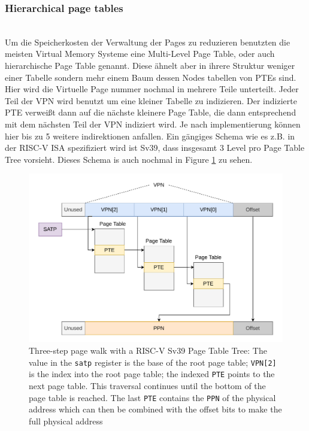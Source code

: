 \subsubsection{Hierarchical page tables}
\\
Um die Speicherkosten der Verwaltung der Pages zu reduzieren benutzten die meisten 
Virtual Memory Systeme eine Multi-Level Page Table, oder auch hierarchische Page Table genannt.
Diese ähnelt aber in ihrere Struktur weniger einer Tabelle sondern mehr einem Baum dessen Nodes tabellen
von PTEs sind.
Hier wird die Virtuelle Page nummer nochmal in mehrere Teile unterteilt. Jeder Teil der VPN
wird benutzt um eine kleiner Tabelle zu indizieren. Der indizierte PTE verweißt dann auf die
nächste kleinere Page Table, die dann entsprechend mit dem nächsten Teil der VPN indiziert wird.
Je nach implementierung können hier bis zu 5 weitere indirektionen anfallen.
Ein gängiges Schema wie es z.B. in der RISC-V ISA spezifiziert wird ist Sv39, dass insgesamt
3 Level pro Page Table Tree vorsieht\cite{riscvreader}. Dieses Schema is auch nochmal
in Figure \ref{fig:fund:pagetree} zu sehen.
\begin{figure}[t]
    \centering
    \includegraphics[scale=.8]{figures/VM-Tree.pdf}
    \caption[RISC-V Sv39 3-Level Page Tree]{Three-step page walk with a RISC-V Sv39 Page Table Tree:
        The value in the \texttt{satp} register is the base of the root page table; \texttt{VPN[2]}
        is the index into the root page table; the indexed \texttt{PTE} points to the next page table.
        This traversal continues until the bottom of the page table is reached. The last \texttt{PTE}
        contains the \texttt{PPN} of the physical address which can then be combined with the offset
        bits to make the full physical address}
    \label{fig:fund:pagetree}
\end{figure}

